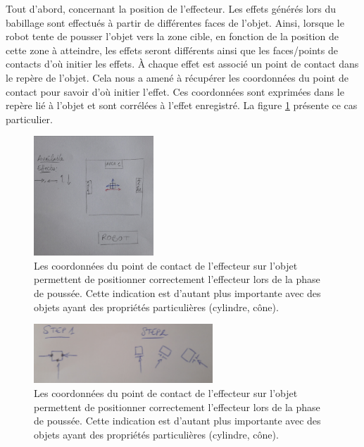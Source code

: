 \documentclass{llncs}
\begin{document}
Tout d'abord, concernant la position de l'effecteur. Les effets générés lors du babillage sont effectués à partir de différentes faces de l'objet. Ainsi, lorsque le robot tente de pousser l'objet vers la zone cible, en fonction de la position de cette zone à atteindre, les effets seront différents ainsi que les faces/points de contacts d'où initier les effets. \`A chaque effet est associé un point de contact dans le repère de l'objet. Cela nous a amené à récupérer les coordonnées du point de contact pour savoir d'où initier l'effet. Ces coordonnées sont exprimées dans le repère lié à l'objet et sont corrélées à l'effet enregistré. La figure \ref{fig:contact_position} présente ce cas particulier.

\begin{figure}[ht]
  \begin{center}
  \includegraphics[width=0.4\textwidth]{figures/contact_position.jpg}
    \caption{Les coordonnées du point de contact de l'effecteur sur l'objet permettent de positionner correctement l'effecteur lors de la phase de poussée. Cette indication est d'autant plus importante avec des objets ayant des propriétés particulières (cylindre, cône).}
  \label{fig:contact_position}
  \end{center}
\end{figure}

\begin{figure}[ht]
  \begin{center}
  \includegraphics[width=0.6\textwidth]{figures/effector_problems.jpg}
    \caption{Les coordonnées du point de contact de l'effecteur sur l'objet permettent de positionner correctement l'effecteur lors de la phase de poussée. Cette indication est d'autant plus importante avec des objets ayant des propriétés particulières (cylindre, cône).}
  \label{fig:effector_problems}
  \end{center}
\end{figure}
\end{document}
